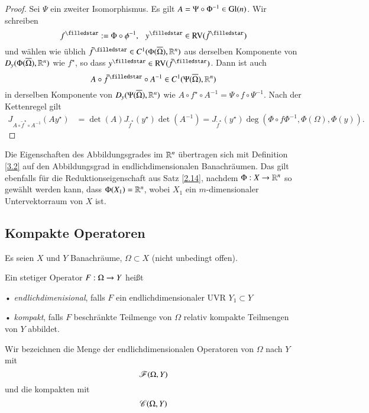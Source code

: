 \begin{proof}
    Sei $\Psi$ ein zweiter Isomorphismus. Es gilt $A=\Psi\circ\Phi^{-1}\in \mathrm{Gl}(n)$. Wir schreiben
    \[
        f^\star:=\Phi \circ \phi^{-1}, \qq y^\star\in \RV(\tilde f^\star)
    \]
    und wählen wie üblich $\tilde f^\star\in C^1(\Phi(\ol\Omega),\R^n)$ aus derselben Komponente von
    $D_y(\Phi(\overline \Omega),\mathbb{R}^n)$ wie $f^\star$, so dass $y^\star\in \RV(\tilde f^\star)$. Dann ist auch
    \[
        A\circ \tilde f^\star \circ A^{-1}\in C^1(\Psi (\ol \Omega),\R^n)
    \]
    in derselben Komponente von $D_y(\Psi(\overline \Omega),\mathbb{R}^n)$ wie $A\circ f^\star\circ A^{-1}=\Psi\circ
    f\circ \Psi^{-1}$.
    Nach der Kettenregel gilt
    \begin{align*}
        J_{A\circ \tilde f^\star\circ A^{-1}}(Ay^\star)&= \det(A) J_{\tilde f^\star}(y^\star)
        \det(A^{-1})=J_{\tilde f^\star} (y^\star) \deg(\Phi\circ f \Phi^{-1},\Phi(\Omega), \Phi (y)).
    \end{align*}
    \[ \]
\end{proof}

Die Eigenschaften des Abbildungsgrades im $\mathbb{R}^n$ übertragen sich mit Definition \ref{3.2} auf den
Abbildungsgrad in endlichdimensionalen Banachräumen. Das gilt ebenfalls für die Reduktionseigenschaft aus
Satz \ref{2.14}, nachdem $\Phi:X\rightarrow\mathbb{R}^n$ so gewählt werden kann, dass $\Phi(X_1)=\mathbb{R}^n$, wobei $X_1$ ein
$m$-dimensionaler Untervektorraum von $X$ ist.

\subsection{Kompakte Operatoren}

Es seien $X$ und $Y$ Banachräume, $\Omega\subset X$ (nicht unbedingt offen).

\begin{defi}
    Ein stetiger Operator $F:\Omega\rightarrow Y$ heißt
    \begin{description}
        \item{•} \textit{endlichdimenisional}, falls $F$ ein endlichdimensionaler UVR $Y_1\subset Y$
        \item{•} \textit{kompakt}, falls $F$ beschränkte Teilmenge von $\Omega$ relativ kompakte
        Teilmengen von $Y$ abbildet.
    \end{description}
    Wir bezeichnen die Menge der endlichdimensionalen Operatoren von $\Omega$ nach $Y$ mit
    \[
        \mathscr F(\Omega,Y)
    \]
    und die kompakten mit
    \[
        \mathscr C(\Omega,Y)
    \]
\end{defi}

